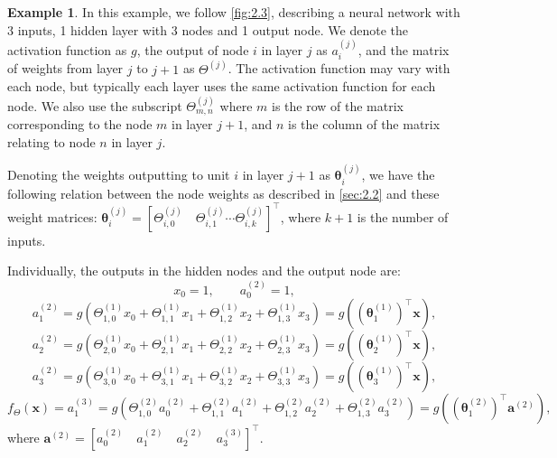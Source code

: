 \documentclass[honours,12pt]{unswthesis}
\numberwithin{equation}{section}
\theoremstyle{definition}
\newtheorem{example}[theorem]{Example}
\begin{document}
\begin{example}
In this example, we follow \autoref{fig:2.3}, describing a neural network with 3 inputs, 1 hidden layer with 3 nodes and 1 output node. We denote the activation function as $g$, the output of node $i$ in layer $j$ as $a^{(j)}_i$, and the matrix of weights from layer $j$ to $j+1$ as $\Theta^{(j)}$. The activation function may vary with each node, but typically each layer uses the same activation function for each node. We also use the subscript $\Theta^{(j)}_{m,n}$ where $m$ is the row of the matrix corresponding to the node $m$ in layer $j+1$, and $n$ is the column of the matrix relating to node $n$ in layer $j$.

Denoting the weights outputting to unit $i$ in layer $j+1$ as $\bm{\theta}^{(j)}_i$, we have the following relation between the node weights as described in \autoref{sec:2.2} and these weight matrices: $\bm{\theta}^{(j)}_i = \left[\Theta_{i,0}^{(j)}\quad \Theta_{i,1}^{(j)}\cdots \Theta_{i,k}^{(j)}\right]^\top$, where $k+1$ is the number of inputs.

Individually, the outputs in the hidden nodes and the output node are:
\[x_0=1,\qquad a_0^{(2)}=1,\]
\[a_1^{(2)}=g\left(\Theta^{(1)}_{1,0}x_0+\Theta^{(1)}_{1,1}x_1+\Theta^{(1)}_{1,2}x_2+\Theta^{(1)}_{1,3}x_3\right)=g\left((\bm{\theta}^{(1)}_1)^\top\bm{x}\right),\]
\[a_2^{(2)}=g\left(\Theta^{(1)}_{2,0}x_0+\Theta^{(1)}_{2,1}x_1+\Theta^{(1)}_{2,2}x_2+\Theta^{(1)}_{2,3}x_3\right)=g\left((\bm{\theta}^{(1)}_2)^\top\bm{x}\right),\]
\[a_3^{(2)}=g\left(\Theta^{(1)}_{3,0}x_0+\Theta^{(1)}_{3,1}x_1+\Theta^{(1)}_{3,2}x_2+\Theta^{(1)}_{3,3}x_3\right)=g\left((\bm{\theta}^{(1)}_3)^\top\bm{x}\right),\]
\[f_\Theta(\bm{x})=a_1^{(3)}=g\left(\Theta^{(2)}_{1,0}a_0^{(2)}+\Theta^{(2)}_{1,1}a_1^{(2)}+\Theta^{(2)}_{1,2}a_2^{(2)}+\Theta^{(2)}_{1,3}a_3^{(2)}\right)=g\left((\bm{\theta}^{(2)}_1)^\top\bm{a}^{(2)}\right),\]
where $\bm{a}^{(2)}=\left[a_0^{(2)}\quad a_1^{(2)}\quad a_2^{(2)}\quad a_3^{(3)}\right]^\top$.
\end{example}
\end{document}
